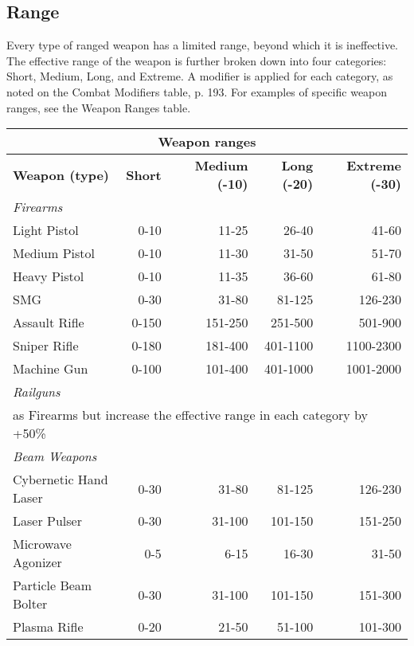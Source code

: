 \subsection{Range}
\label{sec:range}

Every type of ranged weapon has a limited range, beyond which it is ineffective. The effective range of the weapon is further broken down into four categories: Short, Medium, Long, and Extreme. A modifier is applied for each category, as noted on the Combat Modifiers table, p. 193. For examples of specific weapon ranges, see the Weapon Ranges table.

\begin{table}
\begin{tabularx}{\textwidth}{|X|r|r|r|r|}
\hline
\multicolumn{5}{|c|}{\textbf{Weapon ranges}} \\
\hline
\textbf{Weapon (type)} & \textbf{Short} & \textbf{Medium (-10)} & \textbf{Long (-20)} & \textbf{Extreme (-30)}\\
\hline
\multicolumn{5}{|l|}{\emph{Firearms}} \\
\hline
Light Pistol			& 0-10	& 11-25	& 26-40		& 41-60		\\
\hline
Medium Pistol			& 0-10	& 11-30	& 31-50		& 51-70		\\
\hline
Heavy Pistol			& 0-10	& 11-35	& 36-60		& 61-80		\\
\hline
SMG					& 0-30	& 31-80	& 81-125		& 126-230		\\
\hline
Assault Rifle			& 0-150	& 151-250	& 251-500		& 501-900		\\
\hline
Sniper Rifle			& 0-180	& 181-400	& 401-1100	& 1100-2300	\\
\hline
Machine Gun			& 0-100	& 101-400	& 401-1000	& 1001-2000	\\
\hline
\multicolumn{5}{|l|}{\emph{Railguns}}\\
\hline
\multicolumn{5}{|l|}{as Firearms but increase the effective range in each category by +50\%} \\
\hline
\multicolumn{5}{|l|}{\emph{Beam Weapons}} \\
\hline
Cybernetic Hand Laser	& 0-30	& 31-80	& 81-125	& 126-230 \\
\hline
Laser Pulser			& 0-30	& 31-100	& 101-150	& 151-250 \\
\hline
Microwave Agonizer	& 0-5	& 6-15	& 16-30	& 31-50 \\
\hline
Particle Beam Bolter	& 0-30	& 31-100	& 101-150	& 151-300 \\
\hline
Plasma Rifle			& 0-20	& 21-50	& 51-100	& 101-300 \\

\end{tabularx}
\end{table}
